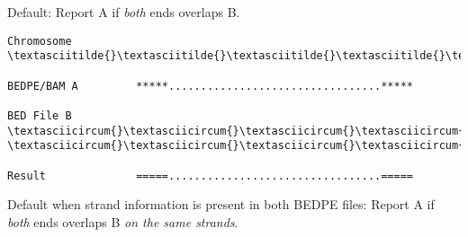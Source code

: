 \documentclass[letterpaper,10pt,english]{sphinxmanual}
\begin{document}
Default: Report A if \emph{both} ends overlaps B.

\begin{Verbatim}[commandchars=\\\{\}]
Chromosome  \textasciitilde{}\textasciitilde{}\textasciitilde{}\textasciitilde{}\textasciitilde{}\textasciitilde{}\textasciitilde{}\textasciitilde{}\textasciitilde{}\textasciitilde{}\textasciitilde{}\textasciitilde{}\textasciitilde{}\textasciitilde{}\textasciitilde{}\textasciitilde{}\textasciitilde{}\textasciitilde{}\textasciitilde{}\textasciitilde{}\textasciitilde{}\textasciitilde{}\textasciitilde{}\textasciitilde{}\textasciitilde{}\textasciitilde{}\textasciitilde{}\textasciitilde{}\textasciitilde{}\textasciitilde{}\textasciitilde{}\textasciitilde{}\textasciitilde{}\textasciitilde{}\textasciitilde{}\textasciitilde{}\textasciitilde{}\textasciitilde{}\textasciitilde{}\textasciitilde{}\textasciitilde{}\textasciitilde{}\textasciitilde{}\textasciitilde{}\textasciitilde{}\textasciitilde{}\textasciitilde{}\textasciitilde{}\textasciitilde{}\textasciitilde{}\textasciitilde{}\textasciitilde{}\textasciitilde{}\textasciitilde{}\textasciitilde{}\textasciitilde{}\textasciitilde{}\textasciitilde{}\textasciitilde{}\textasciitilde{}\textasciitilde{}\textasciitilde{}\textasciitilde{}\textasciitilde{}

BEDPE/BAM A         *****.................................*****

BED File B         \textasciicircum{}\textasciicircum{}\textasciicircum{}\textasciicircum{}\textasciicircum{}\textasciicircum{}\textasciicircum{}\textasciicircum{}                                          \textasciicircum{}\textasciicircum{}\textasciicircum{}\textasciicircum{}\textasciicircum{}\textasciicircum{}

Result              =====.................................=====
\end{Verbatim}

Default when strand information is present in both BEDPE files: Report A if \emph{both} ends overlaps B \emph{on
the same strands}.
\end{document}
